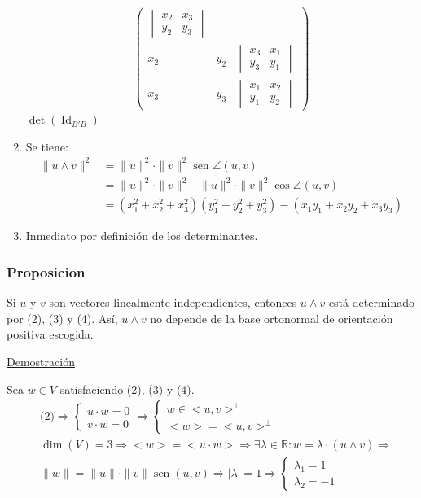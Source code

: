 \documentclass[12pt, a4paper, ones, notitlepage, openany,titlepage]{article}
\newcommand{\demostracion}{\noindent\underline{Demostración}}
\begin{document}
\begin{enumerate}
$$\begin{pmatrix}
\begin{vmatrix}
			x_2 & x_3 \\
			y_2 & y_3
		\end{vmatrix} \\
		x_2 & y_2 & \begin{vmatrix}
			x_3 & x_1 \\
			y_3 & y_1
		\end{vmatrix}\\
		x_3 & y_3 & \begin{vmatrix}
			x_1 & x_2 \\
			y_1 & y_2
		\end{vmatrix}
	\end{pmatrix}
	$$
	$\det(\operatorname{Id}_{B'B})$
	\item Se tiene:
	\begin{align*}
		\|u \wedge v\|^2 & = \|u\|^2 \cdot \|v\|^2 \operatorname{sen} 	\angle (u,v) \\
		& = \|u\|^2 \cdot \|v\|^2 - \|u\|^2 \cdot \|v\|^2 	\operatorname{cos} \angle (u,v) \\
		& = (x^2_1 + x^2_2 + x^2_3)(y^2_1 + y^2_2 + y^2_3) - 
		(x_1 y_1 + x_2 y_2 + x_3 y_3)
	\end{align*}
	\item Inmediato por definición de los determinantes.
\end{enumerate}

\subsubsection{Proposicion}
Si $u$ y $v$ son vectores linealmente independientes, entonces $u \wedge v$ está determinado por (2), (3) y (4). Así, $u \wedge v$ no depende de la base ortonormal de orientación positiva escogida.

\demostracion

Sea $w \in V$ satisfaciendo (2), (3) y (4).
\begin{align*}
	& \text{(2)} \Longrightarrow  
	\begin{cases}
		u \cdot w = 0 \\
		v \cdot w = 0
	\end{cases}
	\Longrightarrow
	\begin{cases}
		w \in <u,v>^\bot \\
		<w> = <u,v>^\bot
	\end{cases}\\
	& \operatorname{dim}(V) = 3 \Longrightarrow <w> = <u \cdot w> \Longrightarrow \exists \lambda \in \mathbb{R} : w = \lambda \cdot (u \wedge v)
	\Longrightarrow \\
	& \|w\| = \|u\| \cdot \|v\| \operatorname{sen}(u,v) \Longrightarrow |\lambda| = 1 \Longrightarrow \begin{cases}
		\lambda_1 = 1 \\
		\lambda_2 = -1
	\end{cases}
\end{align*}
\end{document}
